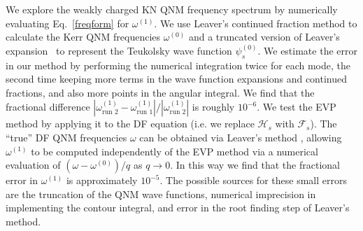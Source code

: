 \begin{refsection}
We explore the weakly charged KN QNM frequency spectrum by numerically evaluating Eq.~\eqref{freqform} for $\omega^{(1)}$. We use Leaver's continued fraction method to calculate the Kerr QNM frequencies $\omega^{(0)}$ and a truncated version of Leaver's expansion~\cite{Leaver1985} to represent the Teukolsky wave function $\psi_s^{(0)}$.
We estimate the error in our method by performing the numerical integration twice for each mode, the second time keeping more terms in the wave function expansions and continued fractions, and also more points in the angular integral. We find that the fractional difference $|\omega^{(1)}_\text{run 2}-\omega^{(1)}_\text{run 1}|/|\omega^{(1)}_\text{run 2}|$ is roughly $10^{-6}$. We test the EVP method by applying it to the DF equation (i.e. we replace $\mathcal{H}_s$ with $\mathcal{F}_s$).  
The ``true'' DF QNM frequencies $\omega$ can be obtained via Leaver's method \cite{BertiKokkotas2005}, allowing $\omega^{(1)}$ to be computed independently of the EVP method via a numerical evaluation of $(\omega-\omega^{(0)})/q$ as $q \to 0$. 
In this way we find that the fractional error in $\omega^{(1)}$ is approximately $10^{-5}$.
The possible sources for these small errors are the truncation of the QNM wave functions, numerical imprecision in implementing the contour integral, and error in the root finding step of Leaver's method.


\end{refsection}
